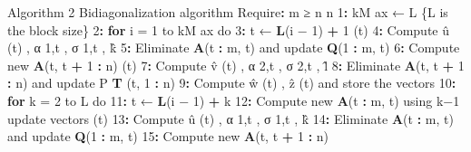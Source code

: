 \documentclass[]{article}
\newenvironment{Shaded}{\begin{snugshade}}{\end{snugshade}}
\newcommand{\KeywordTok}[1]{\textcolor[rgb]{0.13,0.29,0.53}{\textbf{#1}}}
\newcommand{\DecValTok}[1]{\textcolor[rgb]{0.00,0.00,0.81}{#1}}
\newcommand{\StringTok}[1]{\textcolor[rgb]{0.31,0.60,0.02}{#1}}
\newcommand{\ControlFlowTok}[1]{\textcolor[rgb]{0.13,0.29,0.53}{\textbf{#1}}}
\newcommand{\OperatorTok}[1]{\textcolor[rgb]{0.81,0.36,0.00}{\textbf{#1}}}
\newcommand{\NormalTok}[1]{#1}
\begin{document}
\begin{Shaded}
\begin{Highlighting}[]
\NormalTok{Algorithm }\DecValTok{2}\NormalTok{ Bidiagonalization algorithm}
\NormalTok{Require}\OperatorTok{:}\StringTok{ }\NormalTok{m ≥ n}
\NormalTok{n}
\DecValTok{1}\OperatorTok{:}\StringTok{ }\NormalTok{kM ax ← L}
\NormalTok{\{L is the block size\}}
\DecValTok{2}\OperatorTok{:}\StringTok{ }\ControlFlowTok{for}\NormalTok{ i =}\StringTok{ }\DecValTok{1}\NormalTok{ to kM ax do}
\DecValTok{3}\OperatorTok{:}
\NormalTok{t ← }\KeywordTok{L}\NormalTok{(i − }\DecValTok{1}\NormalTok{) }\OperatorTok{+}\StringTok{ }\DecValTok{1}
\NormalTok{(t)}
\DecValTok{4}\OperatorTok{:}
\NormalTok{Compute û (t) , α }\DecValTok{1}\NormalTok{,t , σ }\DecValTok{1}\NormalTok{,t , k̂}
\DecValTok{5}\OperatorTok{:}
\NormalTok{Eliminate }\KeywordTok{A}\NormalTok{(t }\OperatorTok{:}\StringTok{ }\NormalTok{m, t) and update }\KeywordTok{Q}\NormalTok{(}\DecValTok{1} \OperatorTok{:}\StringTok{ }\NormalTok{m, t)}
\DecValTok{6}\OperatorTok{:}
\NormalTok{Compute new }\KeywordTok{A}\NormalTok{(t, t }\OperatorTok{+}\StringTok{ }\DecValTok{1} \OperatorTok{:}\StringTok{ }\NormalTok{n)}
\NormalTok{(t)}
\DecValTok{7}\OperatorTok{:}
\NormalTok{Compute v̂ (t) , α }\DecValTok{2}\NormalTok{,t , σ }\DecValTok{2}\NormalTok{,t , l̂}
\DecValTok{8}\OperatorTok{:}
\NormalTok{Eliminate }\KeywordTok{A}\NormalTok{(t, t }\OperatorTok{+}\StringTok{ }\DecValTok{1} \OperatorTok{:}\StringTok{ }\NormalTok{n) and update P }\KeywordTok{T}\NormalTok{ (t, }\DecValTok{1} \OperatorTok{:}\StringTok{ }\NormalTok{n)}
\DecValTok{9}\OperatorTok{:}
\NormalTok{Compute ŵ (t) , ẑ (t) and store the vectors}
\DecValTok{10}\OperatorTok{:}
\ControlFlowTok{for}\NormalTok{ k =}\StringTok{ }\DecValTok{2}\NormalTok{ to L do}
\DecValTok{11}\OperatorTok{:}
\NormalTok{t ← }\KeywordTok{L}\NormalTok{(i − }\DecValTok{1}\NormalTok{) }\OperatorTok{+}\StringTok{ }\NormalTok{k}
\DecValTok{12}\OperatorTok{:}
\NormalTok{Compute new }\KeywordTok{A}\NormalTok{(t }\OperatorTok{:}\StringTok{ }\NormalTok{m, t) using k−}\DecValTok{1}\NormalTok{ update vectors}
\NormalTok{(t)}
\DecValTok{13}\OperatorTok{:}
\NormalTok{Compute û (t) , α }\DecValTok{1}\NormalTok{,t , σ }\DecValTok{1}\NormalTok{,t , k̂}
\DecValTok{14}\OperatorTok{:}
\NormalTok{Eliminate }\KeywordTok{A}\NormalTok{(t }\OperatorTok{:}\StringTok{ }\NormalTok{m, t) and update }\KeywordTok{Q}\NormalTok{(}\DecValTok{1} \OperatorTok{:}\StringTok{ }\NormalTok{m, t)}
\DecValTok{15}\OperatorTok{:}
\NormalTok{Compute new }\KeywordTok{A}\NormalTok{(t, t }\OperatorTok{+}\StringTok{ }\DecValTok{1} \OperatorTok{:}\StringTok{ }\NormalTok{n)}

\end{Highlighting}
\end{Shaded}
\end{document}

